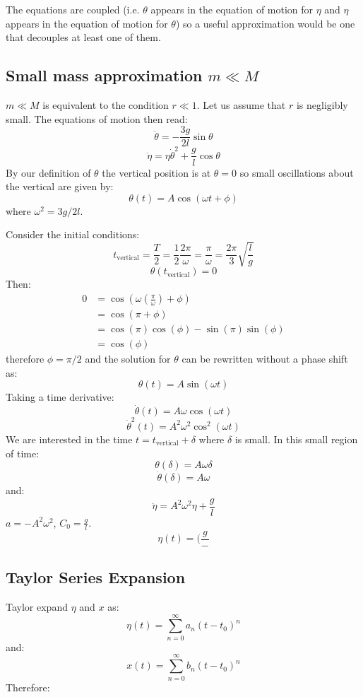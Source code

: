 \documentclass[9pt]{report}
\begin{document}
\begin{enumerate}
The equations are coupled (i.e. $\theta$ appears in the equation of motion for
$\eta$ and $\eta$ appears in the equation of motion for $\theta$) so a useful
approximation would be one that decouples at least one of them.

\subsection{Small mass approximation $m \ll M$}
$m \ll M$ is equivalent to the condition $r \ll 1$. Let us assume that $r$ is
negligibly small. The equations of motion then read:
\begin{equation}
\ddot{\theta} = -\frac{3g}{2l} \sin \theta \label{small_r_el_theta}
\end{equation}
\begin{equation}
\ddot{\eta} = \eta \dot{\theta}^2 \label{small_r_el_eta} + \frac{g}{l} \cos \theta
\end{equation}
By our definition of $\theta$ the vertical position is at $\theta = 0$ so small
oscillations about the vertical are given by:
\[
\theta(t) = A \cos (\omega t + \phi)
\]
where $\omega^2 = 3 g / 2 l$.

Consider the initial conditions:
\[
  t_\text{vertical} = \frac{T}{2} = \frac{1}{2} \frac{2\pi}{\omega} = \frac{\pi}{\omega} = \frac{2\pi}{3}\sqrt{\frac{l}{g}}
\]
\[
 \theta(t_\text{vertical}) = 0
\]
Then:
\[
\begin{align}
0 &= \cos(\omega (\frac{\pi}{\omega}) + \phi) \\
  &= \cos(\pi + \phi)\\
  &= \cos(\pi)\cos(\phi)-\sin(\pi)\sin(\phi)\\
  &= \cos(\phi)
\end{align}
\]
therefore $\phi = \pi/2$ and the solution for $\theta$ can be rewritten without
a phase shift as:
\[
  \theta(t) = A \sin(\omega t)
\]
Taking a time derivative:
\[
\dot{\theta}(t) = A\omega \cos (\omega t)
\]
\[
\dot{\theta}^2(t) = A^2\omega^2 \cos^2 (\omega t)
\]
We are interested in the time $t = t_\text{vertical} + \delta$ where $\delta$ is
small. In this small region of time:
\[
  \theta (\delta) = A\omega \delta
\]
\[
  \dot{\theta} (\delta) = A \omega
\]
and:
\[
  \ddot{\eta} = A^2 \omega^2 \eta + \frac{g}{l}
\]
$a = -A^2 \omega^2$, $C_0 = \frac{g}{l}$.
\[
  \eta(t) = ( \frac{g}{-}
\]

\subsection{Taylor Series Expansion}
Taylor expand $\eta$ and $x$ as:
\[
  \eta(t) = \sum_{n=0}^\infty a_n (t-t_0)^n
\]
and:
\[
  x(t) = \sum_{n=0}^\infty b_n (t-t_0)^n
\]
Therefore:
\end{enumerate}
\end{document}
